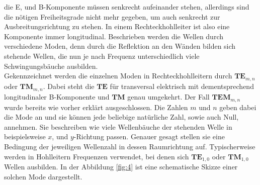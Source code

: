 die E, und B-Komponente müssen senkrecht aufeinander stehen, allerdings sind die nötigen Freiheitsgrade nicht mehr gegeben, um auch senkrecht zur Ausbreitungsrichtung zu stehen. In einem Rechteckhohlleiter ist also eine Komponente immer
longitudinal. Beschrieben werden die Wellen durch verschiedene Moden, denn durch die Reflektion an den Wänden bilden sich stehende Wellen, die nun je nach Frequenz unterschiedlich viele Schwingungsbäuche ausbilden. 
\\
\newline
Gekennzeichnet werden die einzelnen Moden in Rechteckhohlleitern durch $\textbf{TE}_{m,n}$ oder $\textbf{TM}_{m,n}$. Dabei steht die $\textbf{TE}$ für transversal elektrisch mit dementsprechend longitudinaler B-Komponente und $\textbf{TM}$ genau umgekehrt. Der Fall $\textbf{TEM}_{m,n}$ wurde
bereits wie vorher erklärt ausgeschlossen. Die Zahlen $m$ und $n$ geben dabei die Mode an und sie können jede beliebige natürliche Zahl, sowie auch Null, annehmen. Sie beschreiben wie viele Wellenbäuche der stehenden Welle in beispielsweise $x$, und $y$-Richtung passen.
Genauer gesagt stellen sie eine Bedingung der jeweiligen Wellenzahl in dessen Raumrichtung auf. Typischerweise werden in Hohlleitern Frequenzen verwendet, bei denen sich $\textbf{TE}_{1,0}$ oder $\textbf{TM}_{1,0}$ Wellen ausbilden. In der Abbildung \ref{fig:4} ist eine 
schematische Skizze einer solchen Mode dargestellt.

